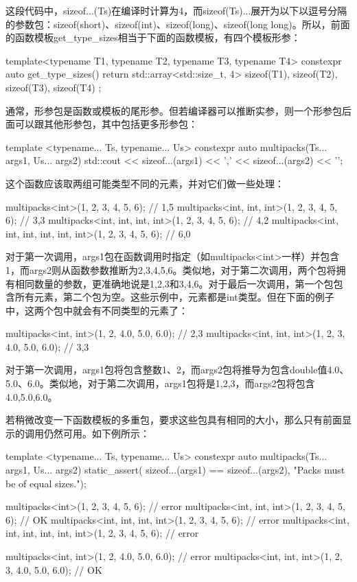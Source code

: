 这段代码中，sizeof...(Ts)在编译时计算为4，而sizeof(Ts)...展开为以下以逗号分隔的参数包：sizeof(short)、sizeof(int)、sizeof(long)、sizeof(long long)。所以，前面的函数模板get\_type\_sizes相当于下面的函数模板，有四个模板形参：

\begin{cpp}
template<typename T1, typename T2,
         typename T3, typename T4>
constexpr auto get_type_sizes()
{
	return std::array<std::size_t, 4> {
		sizeof(T1), sizeof(T2), sizeof(T3), sizeof(T4)
	};
}
\end{cpp}

通常，形参包是函数或模板的尾形参。但若编译器可以推断实参，则一个形参包后面可以跟其他形参包，其中包括更多形参包：

\begin{cpp}
template <typename... Ts, typename... Us>
constexpr auto multipacks(Ts... args1, Us... args2)
{
	std::cout << sizeof...(args1) << ','
	          << sizeof...(args2) << '\n';
}
\end{cpp}

这个函数应该取两组可能类型不同的元素，并对它们做一些处理：

\begin{cpp}
multipacks<int>(1, 2, 3, 4, 5, 6);
                // 1,5
multipacks<int, int, int>(1, 2, 3, 4, 5, 6);
                // 3,3
multipacks<int, int, int, int>(1, 2, 3, 4, 5, 6);
                // 4,2
multipacks<int, int, int, int, int, int>(1, 2, 3, 4, 5, 6);
                // 6,0
\end{cpp}

对于第一次调用，args1包在函数调用时指定（如multipacks<int>一样）并包含1，而args2则从函数参数推断为2,3,4,5,6。类似地，对于第二次调用，两个包将拥有相同数量的参数，更准确地说是1,2,3和3,4,6。对于最后一次调用，第一个包包含所有元素，第二个包为空。这些示例中，元素都是int类型。但在下面的例子中，这两个包中就会有不同类型的元素了：

\begin{cpp}
multipacks<int, int>(1, 2, 4.0, 5.0, 6.0); // 2,3
multipacks<int, int, int>(1, 2, 3, 4.0, 5.0, 6.0); // 3,3
\end{cpp}

对于第一次调用，args1包将包含整数1、2，而args2包将推导为包含double值4.0、5.0、6.0。类似地，对于第二次调用，args1包将是1,2,3，而args2包将包含4.0,5.0,6.0。

若稍微改变一下函数模板的多重包，要求这些包具有相同的大小，那么只有前面显示的调用仍然可用。如下例所示：

\begin{cpp}
template <typename... Ts, typename... Us>
constexpr auto multipacks(Ts... args1, Us... args2)
{
	static_assert(
	sizeof...(args1) == sizeof...(args2),
	"Packs must be of equal sizes.");
}

multipacks<int>(1, 2, 3, 4, 5, 6); // error
multipacks<int, int, int>(1, 2, 3, 4, 5, 6); // OK
multipacks<int, int, int, int>(1, 2, 3, 4, 5, 6); // error
multipacks<int, int, int, int, int, int>(1, 2, 3, 4, 5, 6); // error

multipacks<int, int>(1, 2, 4.0, 5.0, 6.0); // error
multipacks<int, int, int>(1, 2, 3, 4.0, 5.0, 6.0); // OK
\end{cpp}

